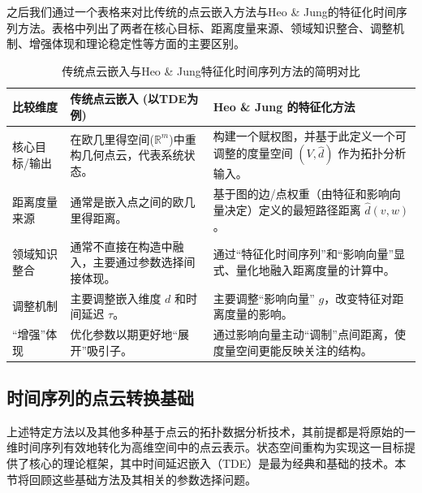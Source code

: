 之后我们通过一个表格来对比传统的点云嵌入方法与Heo \& Jung的特征化时间序列方法。表格中列出了两者在核心目标、距离度量来源、领域知识整合、调整机制、增强体现和理论稳定性等方面的主要区别。
\begin{table}[htbp]
    \centering
    \caption{传统点云嵌入与Heo \& Jung特征化时间序列方法的简明对比}
    \label{tab:embedding_comparison_concise_new}
    \begin{tabular}{>{\raggedright\arraybackslash}p{} >{\raggedright\arraybackslash}p{} >{\raggedright\arraybackslash}p{}}
        \toprule
        \textbf{比较维度}                          & \textbf{传统点云嵌入 (以TDE为例)} & \textbf{Heo \& Jung 的特征化方法} \\
        \midrule
        核心目标/输出                                &
        在欧几里得空间($\mathbb{R}^m$)中重构几何点云，代表系统状态。 &
        构建一个赋权图，并基于此定义一个可调整的度量空间 $(V, \hat{d})$ 作为拓扑分析输入。                                               \\
        \addlinespace
        距离度量来源                                 &
        通常是嵌入点之间的欧几里得距离。                       &
        基于图的边/点权重（由特征和影响向量决定）定义的最短路径距离 $\hat{d}(v,w)$。                                                  \\
        \addlinespace
        领域知识整合                                 &
        通常不直接在构造中融入，主要通过参数选择间接体现。              &
        通过“特征化时间序列”和“影响向量”显式、量化地融入距离度量的计算中。                                                             \\
        \addlinespace
        调整机制                                   &
        主要调整嵌入维度 $d$ 和时间延迟 $\tau$。             &
        主要调整“影响向量” $g$，改变特征对距离度量的影响。                                                                    \\
        \addlinespace
        “增强”体现                                 &
        优化参数以期更好地“展开”吸引子。                      &
        通过影响向量主动“调制”点间距离，使度量空间更能反映关注的结构。                                                                \\

        \bottomrule
    \end{tabular}
\end{table}

\subsection{时间序列的点云转换基础} %
上述特定方法以及其他多种基于点云的拓扑数据分析技术，其前提都是将原始的一维时间序列有效地转化为高维空间中的点云表示。状态空间重构为实现这一目标提供了核心的理论框架，其中时间延迟嵌入（TDE）是最为经典和基础的技术。本节将回顾这些基础方法及其相关的参数选择问题。

